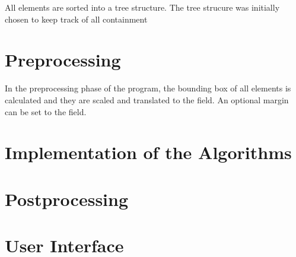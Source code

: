 All elements are sorted into a tree structure. The tree strucure was initially chosen to keep track of all containment 

\section{Preprocessing}

In the preprocessing phase of the program, the bounding box of all elements is calculated and they are scaled and translated to the field. An optional margin can be set to the field.

\section{Implementation of the Algorithms}
\section{Postprocessing}
\section{User Interface}
